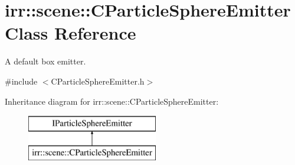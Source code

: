 \hypertarget{classirr_1_1scene_1_1_c_particle_sphere_emitter}{\section{irr\-:\-:scene\-:\-:C\-Particle\-Sphere\-Emitter Class Reference}
\label{classirr_1_1scene_1_1_c_particle_sphere_emitter}
}


A default box emitter.  




{\ttfamily \#include $<$C\-Particle\-Sphere\-Emitter.\-h$>$}

Inheritance diagram for irr\-:\-:scene\-:\-:C\-Particle\-Sphere\-Emitter\-:\begin{figure}[H]
\begin{center}
\leavevmode
\includegraphics[height=2.000000cm]{classirr_1_1scene_1_1_c_particle_sphere_emitter}
\end{center}
\end{figure}
